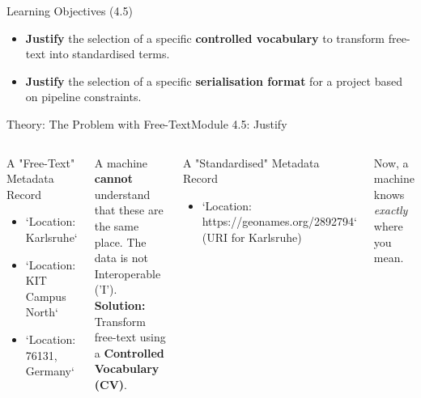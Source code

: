 \begin{frame}{Learning Objectives (4.5)}
    \begin{itemize}
        \item \textbf{Justify} the selection of a specific \textbf{controlled vocabulary} to transform free-text into standardised terms.
        \item \textbf{Justify} the selection of a specific \textbf{serialisation format} for a project based on pipeline constraints.
    \end{itemize}
\end{frame}

\begin{frame}{Theory: The Problem with Free-Text}{Module 4.5: Justify}
   \begin{columns}
    \begin{block}{A "Free-Text" Metadata Record}
        \begin{itemize}
            \item `Location: Karlsruhe`
            \item `Location: KIT Campus North`
            \item `Location: 76131, Germany`
        \end{itemize}
    \end{block}
    \pause
    A machine \textbf{cannot} understand that these are the same place. The data is not Interoperable ('I').\\
    \pause
    \textbf{Solution:} Transform free-text using a \textbf{Controlled Vocabulary (CV)}.
    \pause
    \begin{block}{A "Standardised" Metadata Record}
        \begin{itemize}
            \item `Location: https://geonames.org/2892794` (URI for Karlsruhe)
        \end{itemize}
    \end{block}
    Now, a machine knows \textit{exactly} where you mean.
   \end{columns}
\end{frame}

